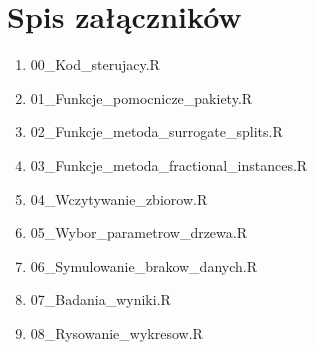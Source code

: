 \documentclass[a4paper,11pt,twoside]{report}
\theoremstyle{definition}
\begin{document}

\listoffigures
\thispagestyle{empty}


\renewcommand{\listtablename}{Spis tabel}
\listoftables
\thispagestyle{empty}



\chapter*{Spis załączników}
\begin{enumerate}
\item 00\_Kod\_sterujacy.R
\item 01\_Funkcje\_pomocnicze\_pakiety.R
\item 02\_Funkcje\_metoda\_surrogate\_splits.R
\item 03\_Funkcje\_metoda\_fractional\_instances.R
\item 04\_Wczytywanie\_zbiorow.R
\item 05\_Wybor\_parametrow\_drzewa.R
\item 06\_Symulowanie\_brakow\_danych.R
\item 07\_Badania\_wyniki.R
\item 08\_Rysowanie\_wykresow.R
\end{enumerate}
\thispagestyle{empty}
\end{document}
